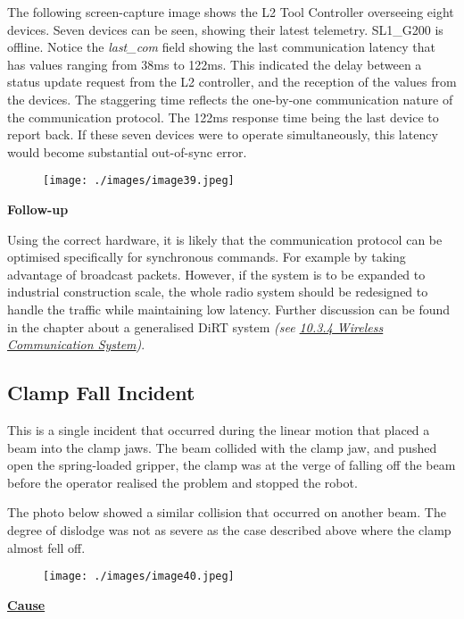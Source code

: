 The following screen-capture image shows the L2 Tool Controller overseeing eight devices. Seven devices can be seen, showing their latest telemetry. SL1\_G200 is offline. Notice the \textit{last\_com }field showing the last communication latency that has values ranging from 38ms to 122ms. This indicated the delay between a status update request from the L2 controller, and the reception of the values from the devices. The staggering time reflects the one-by-one communication nature of the communication protocol. The 122ms response time being the last device to report back. If these seven devices were to operate simultaneously, this latency would become substantial out-of-sync error. 

\begin{figure}[H]
\texttt{[image: ./images/image39.jpeg]}
\end{figure}


\textbf{Follow-up}

Using the correct hardware, it is likely that the communication protocol can be optimised specifically for synchronous commands. For example by taking advantage of broadcast packets. However, if the system is to be expanded to industrial construction scale, the whole radio system should be redesigned to handle the traffic while maintaining low latency. Further discussion can be found in the chapter about a generalised DiRT system \textit{(see \uline{10.3.4 Wireless Communication System})}. 

\subsection{Clamp Fall Incident}

This is a single incident that occurred during the linear motion that placed a beam into the clamp jaws. The beam collided with the clamp jaw, and pushed open the spring-loaded gripper, the clamp was at the verge of falling off the beam before the operator realised the problem and stopped the robot.

The photo below showed a similar collision that occurred on another beam. The degree of dislodge was not as severe as the case described above where the clamp almost fell off.

\begin{figure}[H]
\texttt{[image: ./images/image40.jpeg]}
\end{figure}


\textbf{\uline{Cause}}

